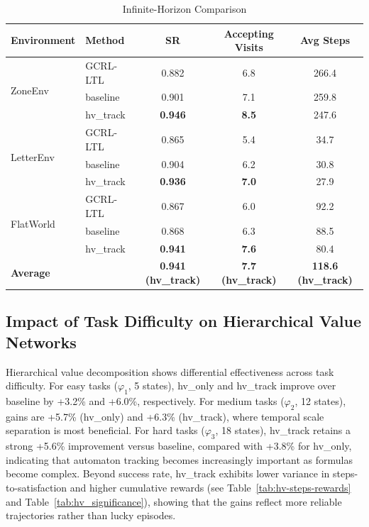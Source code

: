 \documentclass[journal]{IEEEtran}
\begin{document}
\begin{table}[t]
\centering
\caption{Infinite-Horizon Comparison}
\label{tab:infinite_horizon}
\begin{tabular}{@{}llccc@{}}
\toprule
\textbf{Environment} & \textbf{Method} & \textbf{SR} & \textbf{Accepting Visits} & \textbf{Avg Steps} \\ \midrule
\multirow{3}{*}{ZoneEnv} 
& GCRL-LTL & 0.882 & 6.8 & 266.4 \\
& baseline & 0.901 & 7.1 & 259.8 \\
& hv\_track & \textbf{0.946} & \textbf{8.5} & 247.6 \\ \midrule
\multirow{3}{*}{LetterEnv} 
& GCRL-LTL & 0.865 & 5.4 & 34.7 \\
& baseline & 0.904 & 6.2 & 30.8 \\
& hv\_track & \textbf{0.936} & \textbf{7.0} & 27.9 \\ \midrule
\multirow{3}{*}{FlatWorld} 
& GCRL-LTL & 0.867 & 6.0 & 92.2 \\
& baseline & 0.868 & 6.3 & 88.5 \\
& hv\_track & \textbf{0.941} & \textbf{7.6} & 80.4 \\ \midrule
\multicolumn{2}{l}{\textbf{Average}} & \textbf{0.941 (hv\_track)} & \textbf{7.7 (hv\_track)} & \textbf{118.6 (hv\_track)} \\ \bottomrule
\end{tabular}
\end{table}

\subsection{Impact of Task Difficulty on Hierarchical Value Networks}

Hierarchical value decomposition shows differential effectiveness across task difficulty. For easy tasks ($\varphi_1$, 5 states), hv\_only and hv\_track improve over baseline by +3.2\% and +6.0\%, respectively. For medium tasks ($\varphi_2$, 12 states), gains are +5.7\% (hv\_only) and +6.3\% (hv\_track), where temporal scale separation is most beneficial. For hard tasks ($\varphi_3$, 18 states), hv\_track retains a strong +5.6\% improvement versus baseline, compared with +3.8\% for hv\_only, indicating that automaton tracking becomes increasingly important as formulas become complex. Beyond success rate, hv\_track exhibits lower variance in steps-to-satisfaction and higher cumulative rewards (see Table~\ref{tab:hv-steps-rewards} and Table~\ref{tab:hv_significance}), showing that the gains reflect more reliable trajectories rather than lucky episodes.
\end{document}
